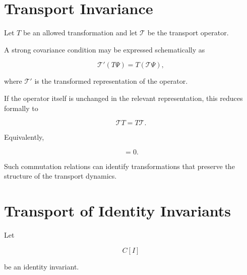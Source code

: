 \documentclass[12pt,oneside]{book}
\begin{document}

\section{Transport Invariance}
\label{sec:transport-invariance}

Let \(T\) be an allowed transformation and let
\(\mathcal{T}\) be the transport operator.

A strong covariance condition may be expressed schematically as

\begin{equation}
    \mathcal{T}'
    \left(
        T\Psi
    \right)
    =
    T
    \left(
        \mathcal{T}\Psi
    \right),
    \label{eq:transport-covariance}
\end{equation}

where \(\mathcal{T}'\) is the transformed representation of the
operator.

If the operator itself is unchanged in the relevant
representation, this reduces formally to

\begin{equation}
    \mathcal{T}T
    =
    T\mathcal{T}.
    \label{eq:transport-commutation}
\end{equation}

Equivalently,

\begin{equation}
    [\mathcal{T},T]
    =
    0.
    \label{eq:transport-commutator}
\end{equation}

Such commutation relations can identify transformations that
preserve the structure of the transport dynamics.


\section{Transport of Identity Invariants}
\label{sec:transport-identity-invariants}

Let

\begin{equation}
    C[I]
\end{equation}

be an identity invariant.
\end{document}
